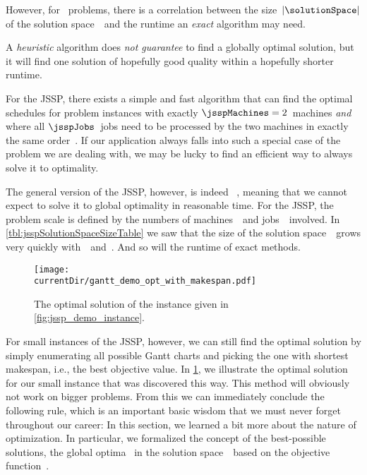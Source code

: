 However, for \NPhard\ problems, there is a correlation between the size~$|\solutionSpace|$ of the solution space~\solutionSpace\ and the runtime an \emph{exact} algorithm may need.%
%
\begin{definition}%
A \emph{heuristic} algorithm does \emph{not guarantee} to find a globally optimal solution, but it will find one solution of hopefully good quality within a hopefully shorter runtime.%
\end{definition}%
%
%
%
%
For the \gls{JSSP}, there exists a simple and fast algorithm that can find the optimal schedules for problem instances with exactly $\jsspMachines=2$~machines \emph{and} where all $\jsspJobs$~jobs need to be processed by the two machines in exactly the same order~\cite{J1954OTATSPSWSTI}.
If our application always falls into such a special case of the problem we are dealing with, we may be lucky to find an efficient way to always solve it to optimality.

The general version of the \gls{JSSP}, however, is indeed \NPhard~\cite{LLRKS1993SASAAC,CPW1998AROMSCAAA}, meaning that we cannot expect to solve it to global optimality in reasonable time.
For the \gls{JSSP}, the problem scale is defined by the numbers of machines~\jsspMachines\ and jobs~\jsspJobs\ involved.
In \cref{tbl:jsspSolutionSpaceSizeTable} we saw that the size of the solution space~\solutionSpace\ grows very quickly with~\jsspMachines\ and~\jsspJobs.
And so will the runtime of exact methods.

\begin{figure}%
\centering%
\texttt{[image: \\currentDir/gantt\_demo\_opt\_with\_makespan.pdf]}%
\caption{The optimal solution of the  instance given in \cref{fig:jssp_demo_instance}.}%
\label{fig:gantt_demo_opt_with_makespan}%
\end{figure}

For small instances of the \gls{JSSP}, however, we can still find the optimal solution by simply enumerating all possible Gantt charts and picking the one with shortest makespan, i.e., the best objective value.
In \cref{fig:gantt_demo_opt_with_makespan}, we illustrate the optimal solution for our small  instance that was discovered this way.
This method will obviously not work on bigger problems.%
%
%
%
From this we can immediately conclude the following rule, which is an important basic wisdom that we must never forget throughout our career:%
%
%
%
\endhsection%
%
%
In this section, we learned a bit more about the nature of optimization.
In particular, we formalized the concept of the best-possible solutions, the global optima~\globalOptimumOf{\solspel} in the solution space~\solutionSpace\ based on the objective function~\objf.

